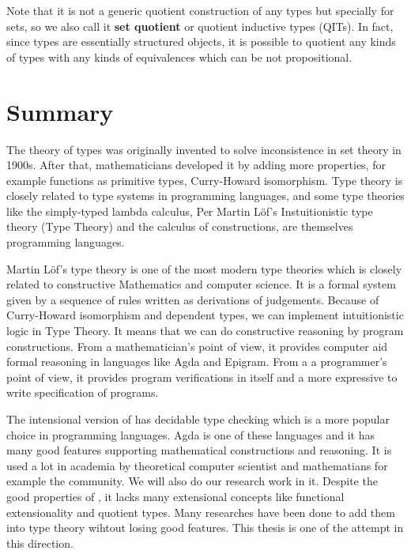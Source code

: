 Note that it is not a generic quotient construction of any types but specially for sets, so
we also call it \textbf{set quotient} or quotient inductive types (QITs). In fact, since types are essentially structured objects, it is possible to quotient any kinds of types with any kinds of equivalences which can be not propositional.
 

\section{Summary}


The theory of types was originally invented to solve inconsistence in set theory in 1900s. After that, mathematicians developed it by adding more properties, for example functions as primitive types, Curry-Howard isomorphism. Type theory is closely related to type systems in programming languages, and some type theories like the simply-typed lambda calculus, Per Martin L\"{o}f's Instuitionistic type theory (Type Theory) and the calculus of constructions, are themselves programming languages. 

Martin L\"{o}f's type theory is one of the most modern type theories which is closely related to constructive Mathematics and computer science. It is a formal system given by a sequence of rules written as derivations of judgements. Because of Curry-Howard isomorphism and dependent types, we can implement intuitionistic logic in Type Theory. It means that we can do constructive reasoning by program constructions. From a mathematician's point of view, it provides computer aid formal reasoning in languages like Agda and Epigram. From a a programmer's point of view, it provides program verifications in itself and a more expressive to write specification of programs.

The intensional version of \mltt has decidable type checking which is a more popular choice in programming languages. Agda is one of these languages and it has many good features supporting mathematical constructions and reasoning. It is used a lot in academia by theoretical computer scientist and mathematians for example the \hott community. We will also do our research work in it.
Despite the good properties of \itt, it lacks many extensional concepts like functional extensionality and quotient types. Many researches have been done to add them into type theory wihtout losing good features. This thesis is one of the attempt in this direction.



